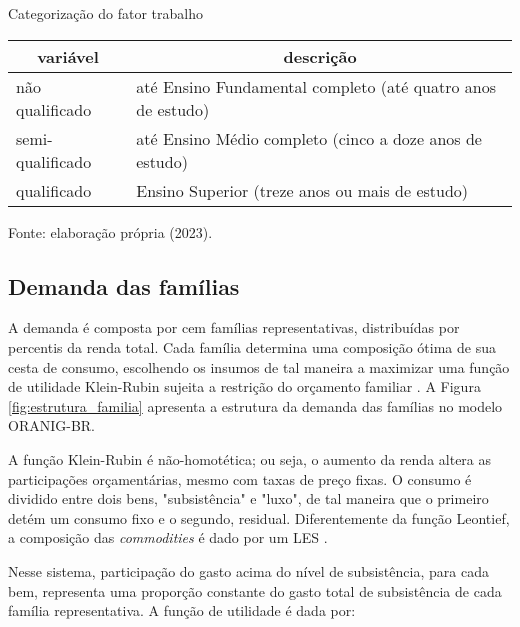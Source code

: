 \begin{quadro}[h]
	\centering
	\begin{threeparttable}
		\caption{Categorização do fator trabalho}
		\footnotesize
		\label{quad:categoria_trabalho}
		\begin{tabular}{|| m{3cm} | m{9cm} ||}
			\hline \hline
			\multicolumn{1}{||c|}{\textbf{variável}} & \multicolumn{1}{c||}{\textbf{descrição}} \\ \hline
			não qualificado  & até Ensino Fundamental completo (até quatro anos de estudo) \\ \hline 
			semi-qualificado & até Ensino Médio completo (cinco a doze anos de estudo) \\ \hline
			qualificado      & Ensino Superior (treze anos ou mais de estudo) \\ \hline \hline
		\end{tabular}
		\begin{tablenotes}
			\scriptsize
			\item Fonte: elaboração própria (2023).
		\end{tablenotes}
	\end{threeparttable}
\end{quadro}

\subsection{Demanda das famílias} \label{subsec:demanda_familias}

A demanda é composta por cem famílias representativas, distribuídas por percentis da renda total. Cada família determina uma composição ótima de sua cesta de consumo, escolhendo os insumos de tal maneira a maximizar uma função de utilidade Klein-Rubin sujeita a restrição do orçamento familiar \cite{horridge03}. A Figura \ref{fig:estrutura_familia} apresenta a estrutura da demanda das famílias no modelo ORANIG-BR.

A função Klein-Rubin é não-homotética; ou seja, o aumento da renda altera as participações orçamentárias, mesmo com taxas de preço fixas. O consumo é dividido entre dois bens, "subsistência" e "luxo", de tal maneira que o primeiro detém um consumo fixo e o segundo, residual. Diferentemente da função Leontief, a composição das \textit{commodities} é dado por um LES \cite{horridge03}.

Nesse sistema, participação do gasto acima do nível de subsistência, para cada bem, representa uma proporção constante do gasto total de subsistência de cada família representativa. A função de utilidade é dada por:

